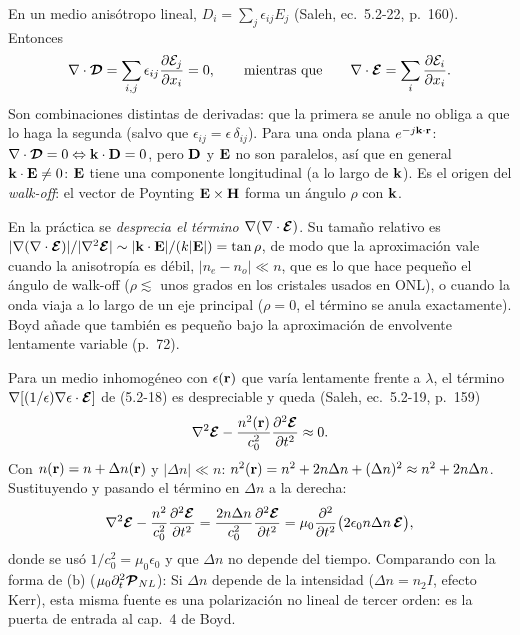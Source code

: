  En un medio anisótropo lineal, $D_i=\sum_j\epsilon_{ij}E_j$ (Saleh, ec.~5.2-22, p.~160). Entonces
\begin{equation*}
\nabla\cdot\boldsymbol{\mathcal D}=\sum_{i,j}\epsilon_{ij}\frac{\partial\mathcal E_j}{\partial x_i}=0,
\qquad\text{mientras que}\qquad
\nabla\cdot\boldsymbol{\mathcal E}=\sum_{i}\frac{\partial\mathcal E_i}{\partial x_i}.
\end{equation*}
Son combinaciones distintas de derivadas: que la primera se anule no obliga a que lo haga la
segunda (salvo que $\epsilon_{ij}=\epsilon\,\delta_{ij}$). Para una onda plana $e^{-j\mathbf k\cdot\mathbf r}$:
$\nabla\cdot\boldsymbol{\mathcal D}=0\Leftrightarrow\mathbf k\cdot\mathbf D=0$, pero $\mathbf D$ y $\mathbf E$ no son paralelos, así que en general
$\mathbf k\cdot\mathbf E\neq0$: $\mathbf E$ tiene una componente longitudinal (a lo largo de $\mathbf k$). Es el origen del
\emph{walk-off}: el vector de Poynting $\mathbf E\times\mathbf H$ forma un ángulo $\rho$ con $\mathbf k$.

En la práctica se \emph{desprecia el término $\nabla(\nabla\cdot\boldsymbol{\mathcal E})$}. Su tamaño relativo es
$|\nabla(\nabla\cdot\boldsymbol{\mathcal E})|/|\nabla^2\boldsymbol{\mathcal E}|\sim|\mathbf k\cdot\mathbf E|/(k|\mathbf E|)=\tan\rho$, de modo que la aproximación
vale cuando la anisotropía es débil, $|n_e-n_o|\ll n$, que es lo que hace pequeño el ángulo de walk-off
($\rho\lesssim$ unos grados en los cristales usados en ONL), o cuando la onda viaja a lo largo de un
eje principal ($\rho=0$, el término se anula exactamente). Boyd añade que también es pequeño
bajo la aproximación de envolvente lentamente variable (p.~72).

 Para un medio inhomogéneo con $\epsilon(\mathbf r)$ que varía lentamente frente a $\lambda$, el término
$\nabla[(1/\epsilon)\nabla\epsilon\cdot\boldsymbol{\mathcal E}]$ de (5.2-18) es despreciable y queda (Saleh, ec.~5.2-19, p.~159)
\begin{equation*}
\nabla^2\boldsymbol{\mathcal E}-\frac{n^2(\mathbf r)}{c_0^2}\frac{\partial^2\boldsymbol{\mathcal E}}{\partial t^2}\approx0 .
\end{equation*}
Con $n(\mathbf r)=n+\Delta n(\mathbf r)$ y $|\Delta n|\ll n$:
$n^2(\mathbf r)=n^2+2n\Delta n+(\Delta n)^2\approx n^2+2n\Delta n$. Sustituyendo y pasando el término en
$\Delta n$ a la derecha:
\begin{equation*}
\nabla^2\boldsymbol{\mathcal E}-\frac{n^2}{c_0^2}\frac{\partial^2\boldsymbol{\mathcal E}}{\partial t^2}=\frac{2n\Delta n}{c_0^2}\frac{\partial^2\boldsymbol{\mathcal E}}{\partial t^2}
=\mu_0\frac{\partial^2}{\partial t^2}\big(2\epsilon_0 n\Delta n\,\boldsymbol{\mathcal E}\big),
\end{equation*}
donde se usó $1/c_0^2=\mu_0\epsilon_0$ y que $\Delta n$ no depende del tiempo. Comparando con la
forma de (b) ($\mu_0\partial_t^2\boldsymbol{\mathcal P}_{NL}$):
Si $\Delta n$ depende de la intensidad ($\Delta n=n_2I$, efecto Kerr), esta misma fuente es una
polarización no lineal de tercer orden: es la puerta de entrada al cap.~4 de Boyd.

